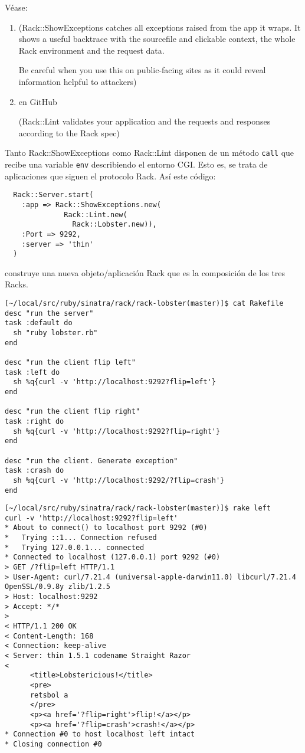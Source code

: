 Véase:
\begin{enumerate}
\item 
{}

(Rack::ShowExceptions catches all exceptions raised from the app it
wraps.  It shows a useful backtrace with the sourcefile and
clickable context, the whole Rack environment and the request
data.

Be careful when you use this on public-facing sites as it could
reveal information helpful to attackers)
\item 
{}
en GitHub

(Rack::Lint validates your application and the requests and
 responses according to the Rack spec)
\end{enumerate}
Tanto Rack::ShowExceptions como Rack::Lint disponen de un método \verb|call| que recibe una variable \verb|env| describiendo el entorno CGI.
Esto es, se trata de aplicaciones que siguen el protocolo Rack.
Así este código:
\begin{verbatim}
  Rack::Server.start(
    :app => Rack::ShowExceptions.new(
              Rack::Lint.new(
                Rack::Lobster.new)), 
    :Port => 9292,
    :server => 'thin'
  )
\end{verbatim}

construye una nueva objeto/aplicación Rack que es la composición
de los tres Racks.

\begin{verbatim}
[~/local/src/ruby/sinatra/rack/rack-lobster(master)]$ cat Rakefile 
desc "run the server"
task :default do
  sh "ruby lobster.rb"
end

desc "run the client flip left"
task :left do
  sh %q{curl -v 'http://localhost:9292?flip=left'}
end

desc "run the client flip right"
task :right do
  sh %q{curl -v 'http://localhost:9292?flip=right'}
end

desc "run the client. Generate exception"
task :crash do
  sh %q{curl -v 'http://localhost:9292/?flip=crash'}
end
\end{verbatim}

\begin{verbatim}
[~/local/src/ruby/sinatra/rack/rack-lobster(master)]$ rake left
curl -v 'http://localhost:9292?flip=left'
* About to connect() to localhost port 9292 (#0)
*   Trying ::1... Connection refused
*   Trying 127.0.0.1... connected
* Connected to localhost (127.0.0.1) port 9292 (#0)
> GET /?flip=left HTTP/1.1
> User-Agent: curl/7.21.4 (universal-apple-darwin11.0) libcurl/7.21.4 OpenSSL/0.9.8y zlib/1.2.5
> Host: localhost:9292
> Accept: */*
> 
< HTTP/1.1 200 OK
< Content-Length: 168
< Connection: keep-alive
< Server: thin 1.5.1 codename Straight Razor
< 
      <title>Lobstericious!</title>
      <pre>
      retsbol a
      </pre>
      <p><a href='?flip=right'>flip!</a></p>
      <p><a href='?flip=crash'>crash!</a></p>
* Connection #0 to host localhost left intact
* Closing connection #0
\end{verbatim}

